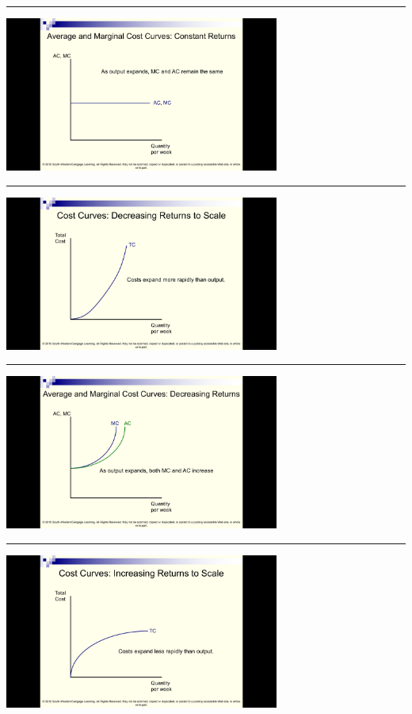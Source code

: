 \documentclass[]{article}
\begin{document}
\begin{center}\rule{0.5\linewidth}{\linethickness}\end{center}

\includegraphics[height=2in]{picsfigs/crscostcurves}

\begin{center}\rule{0.5\linewidth}{\linethickness}\end{center}

\includegraphics[height=2in]{picsfigs/drsTCcurve.png}

\begin{center}\rule{0.5\linewidth}{\linethickness}\end{center}

\includegraphics[height=2in]{picsfigs/drscostcurves}

\begin{center}\rule{0.5\linewidth}{\linethickness}\end{center}

\includegraphics[height=2in]{picsfigs/irsTCcurve.png}
\end{document}
